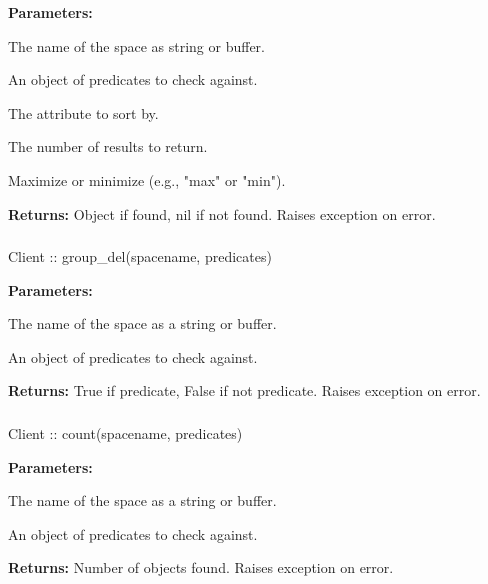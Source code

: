 \noindent\textbf{Parameters:}
\begin{description}[labelindent=\widthof{{\code{predicates}}},leftmargin=*,noitemsep,nolistsep,align=right]
\item[\code{spacename}] The name of the space as string or buffer.
\item[\code{predicates}] An object of predicates to check against.
\item[\code{sortby}] The attribute to sort by.
\item[\code{limit}] The number of results to return.
\item[\code{maxmin}] Maximize or minimize (e.g., "max" or "min").
\end{description}

\noindent\textbf{Returns:}
Object if found, nil if not found.  Raises exception on error.

\subsubsection{}
\label{api:nodejs:group_del}
\begin{javascriptcode}
Client :: group_del(spacename, predicates)
\end{javascriptcode}
\funcdesc 

\noindent\textbf{Parameters:}
\begin{description}[labelindent=\widthof{{\code{predicates}}},leftmargin=*,noitemsep,nolistsep,align=right]
\item[\code{spacename}] The name of the space as a string or buffer.
\item[\code{predicates}] An object of predicates to check against.
\end{description}

\noindent\textbf{Returns:}
True if predicate, False if not predicate.  Raises exception on error.

\subsubsection{}
\label{api:nodejs:count}
\begin{javascriptcode}
Client :: count(spacename, predicates)
\end{javascriptcode}
\funcdesc 

\noindent\textbf{Parameters:}
\begin{description}[labelindent=\widthof{{\code{predicates}}},leftmargin=*,noitemsep,nolistsep,align=right]
\item[\code{spacename}] The name of the space as a string or buffer.
\item[\code{predicates}] An object of predicates to check against.
\end{description}

\noindent\textbf{Returns:}
Number of objects found.  Raises exception on error.
